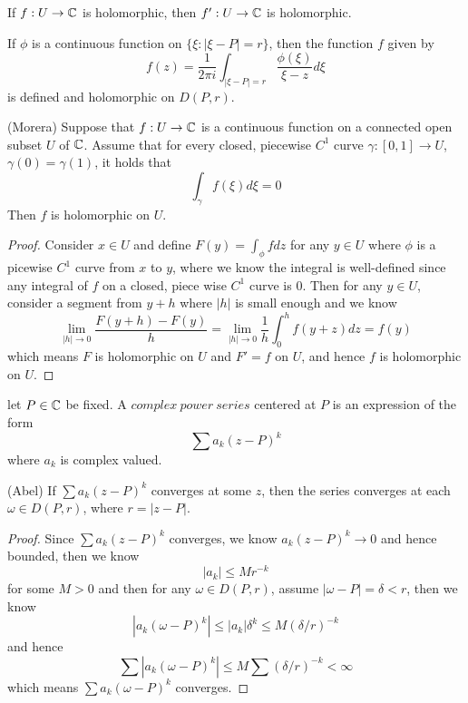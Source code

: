 \begin{corollary}
    If $f:U\to\mathbb{C}$ is holomorphic, then $f':U\to \mathbb{C}$ is holomorphic.
\end{corollary}

\begin{theorem}
    If $\phi$ is a continuous function on $\{\xi:|\xi-P| = r\}$, then the function $f$ given by
    \[
    f(z) = \dfrac{1}{2\pi i}\int_{|\xi-P|=r}\dfrac{\phi(\xi)}{\xi-z}d\xi
    \]
    is defined and holomorphic on $D(P,r)$.
\end{theorem}

\begin{theorem}
    (Morera) Suppose that $f:U\to \mathbb{C}$ is a continuous function on a connected open subset $U$ of $\mathbb{C}$. Assume that for every closed, piecewise $C^1$ curve $\gamma:[0,1]\to U$, $\gamma(0) = \gamma(1)$, it holds that
    \[
    \int_{\gamma} f(\xi) d\xi = 0
    \]
    Then $f$ is holomorphic on $U$.
\end{theorem}
\begin{proof}
    Consider $x\in U$ and define $F(y) = \int_{\phi} fdz$ for any $y\in U$ where $\phi$ is a picewise $C^1$ curve from $x$ to $y$, where we know the integral is well-defined since any integral of $f$ on a closed, piece wise $C^1$ curve is $0$. Then for any $y\in U$, consider a segment from $y+h$ where $|h|$ is small enough and we know
    \[
    \lim_{|h|\to 0}\dfrac{F(y+h)-F(y)}{h} = \lim_{|h|\to 0}\dfrac{1}{h}\int_0^h f(y+z) dz = f(y)
    \]
    which means $F$ is holomorphic on $U$ and $F' = f$ on $U$, and hence $f$ is holomorphic on $U$.
\end{proof}

\begin{definition}
    let $P\in\mathbb{C}$ be fixed. A $complex\ power\ series$ centered at $P$ is an expression of the form
    \[
    \sum a_k(z-P)^k
    \]
    where $a_k$ is complex valued.
\end{definition}

\begin{lemma}
    (Abel) If $\sum a_k(z-P)^k$ converges at some $z$, then the series converges at each $\omega \in D(P,r)$, where $r = |z-P|$.
\end{lemma}
\begin{proof}\par
    Since $\sum a_k(z-P)^k$ converges, we know $a_k(z-P)^k \to 0$ and hence bounded, then we know 
    \[
    |a_k| \leq Mr^{-k}
    \]
    for some $M>0$ and then for any $\omega \in D(P,r)$, assume $|\omega - P| = \delta < r$, then we know
    \[
    |a_k(\omega-P)^k| \leq |a_k|\delta^k \leq M(\delta/r)^{-k}
    \]
    and hence
    \[
    \sum |a_k(\omega-P)^k| \leq M\sum (\delta/r)^{-k} < \infty
    \]
    which means $\sum a_k(\omega-P)^k$ converges.
\end{proof}

